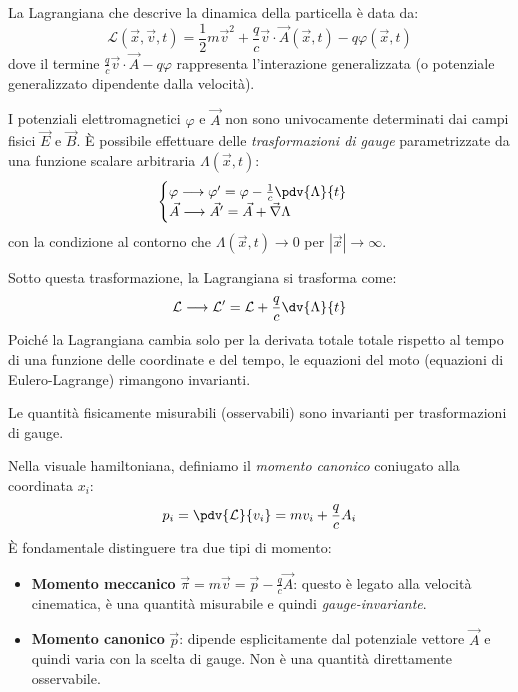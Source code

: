 La Lagrangiana che descrive la dinamica della particella è data da:
\begin{equation}
    \mathcal{L}(\vec{x}, \vec{v}, t) = \frac{1}{2}m\vec{v}^2 + \frac{q}{c} \vec{v} \cdot \vec{A}(\vec{x},t) - q\varphi(\vec{x},t)
\end{equation}
dove il termine \( \frac{q}{c} \vec{v} \cdot \vec{A} - q\varphi \) rappresenta l'interazione generalizzata (o potenziale generalizzato dipendente dalla velocità).


I potenziali elettromagnetici $\varphi$ e $\vec{A}$ non sono univocamente determinati dai campi fisici $\vec{E}$ e $\vec{B}$. 
È possibile effettuare delle \textit{trasformazioni di gauge} parametrizzate da una funzione scalare arbitraria $\Lambda(\vec{x},t)$:
\begin{equation}
    \begin{cases}
            \varphi \longrightarrow \varphi' = \varphi - \frac{1}{c} \pdv{\Lambda}{t} \\
            \vec{A} \longrightarrow \vec{A}' = \vec{A} + \vec{\nabla}\Lambda
        \end{cases}
\end{equation}
con la condizione al contorno che $\Lambda(\vec{x},t) \to 0$ per $|\vec{x}| \to \infty$.

Sotto questa trasformazione, la Lagrangiana si trasforma come:
\[
    \mathcal{L} \longrightarrow \mathcal{L}' = \mathcal{L} + \frac{q}{c} \dv{\Lambda}{t}
\]
Poiché la Lagrangiana cambia solo per la derivata totale totale rispetto al tempo di una funzione delle coordinate e del tempo, le equazioni del moto (equazioni di Eulero-Lagrange) rimangono invarianti.

\begin{attention}
    Le quantità fisicamente misurabili (osservabili) sono invarianti per trasformazioni di gauge.
\end{attention}

Nella visuale hamiltoniana, definiamo il \textit{momento canonico} coniugato alla coordinata $x_i$:
\[
    p_i = \pdv{\mathcal{L}}{v_i} = m v_i + \frac{q}{c} A_i
\]
È fondamentale distinguere tra due tipi di momento:
\begin{itemize}
    \item \textbf{Momento meccanico} $\vec{\pi} = m\vec{v} = \vec{p} - \frac{q}{c}\vec{A}$: questo è legato alla velocità cinematica, è una quantità misurabile e quindi \textit{gauge-invariante}.
    \item \textbf{Momento canonico} $\vec{p}$: dipende esplicitamente dal potenziale vettore $\vec{A}$ e quindi varia con la scelta di gauge. Non è una quantità direttamente osservabile.
\end{itemize}

